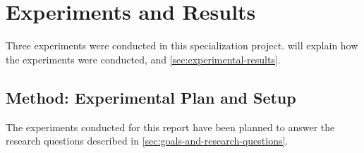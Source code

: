 \chapter{Experiments and Results}
\label{cha:experiments}

Three experiments were conducted in this specialization project.  will explain how the experiments were conducted, and \autoref{sec:experimental-results}.

\section{Method: Experimental Plan and Setup}
\label{sec:experimental-plan-and-setup}

The experiments conducted for this report have been planned to answer the research questions described in \autoref{sec:goals-and-research-questions}.

